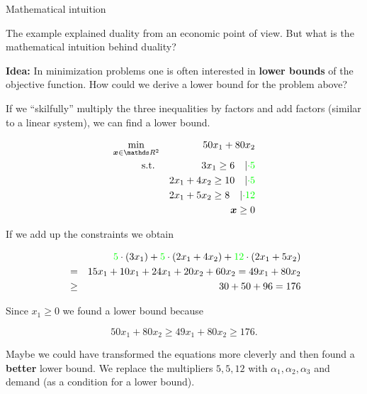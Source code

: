 \documentclass[11pt,compress,t,notes=noshow, xcolor=table]{beamer}
\begin{document}
\normalsize
\begin{vbframe}{Mathematical intuition}

The example explained duality from an economic point of view. But what is the mathematical intuition behind duality?

\lz

\textbf{Idea: } In minimization problems one is often interested in \textbf{lower bounds} of the objective function. How could we derive a lower bound for the problem above?

\lz

If we \enquote{skilfully} multiply the three inequalities by factors and add factors (similar to a linear system), we can find a lower bound.

\framebreak
\vspace*{-1.6cm}

\begin{eqnarray*}
\min_{\bm{x}\in \R^2} && 50x_1 + 80x_2  \\
\text{s.t. } && 3x_1 \ge 6 \quad \vert\textcolor{green}{\cdot 5}\\
&& 2x_1 + 4x_2 \ge 10 \quad \vert \textcolor{green}{\cdot 5} \\
&& 2x_1 + 5x_2 \ge 8 \quad \vert \textcolor{green}{\cdot 12} \\
&& \bm{x} \ge 0
\end{eqnarray*}

\vspace*{-0.2cm}

If we add up the constraints we obtain

\vspace*{-0.5cm}
\begin{eqnarray*}
& & \textcolor{green}{5} \cdot (3x_1) + \textcolor{green}{5} \cdot (2x_1 + 4x_2) + \textcolor{green}{12} \cdot (2x_1 + 5x_2)
\\ &=& 15x_1 + 10x_1 + 24x_1 + 20x_2 + 60x_2 = 49 x_1 + 80 x_2 \\
&\ge& 30 + 50 + 96 = 176
\end{eqnarray*}

Since $x_1 \ge 0$ we found a lower bound because

$$
50x_1 + 80 x_2 \ge 49 x_1 + 80 x_2 \ge 176.
$$

\framebreak

Maybe we could have transformed the equations more cleverly and then found a \textbf{better} lower bound. We replace the multipliers $5, 5, 12$ with $\alpha_1, \alpha_2, \alpha_3$ and demand (as a condition for a lower bound).


\end{vbframe}
\end{document}
